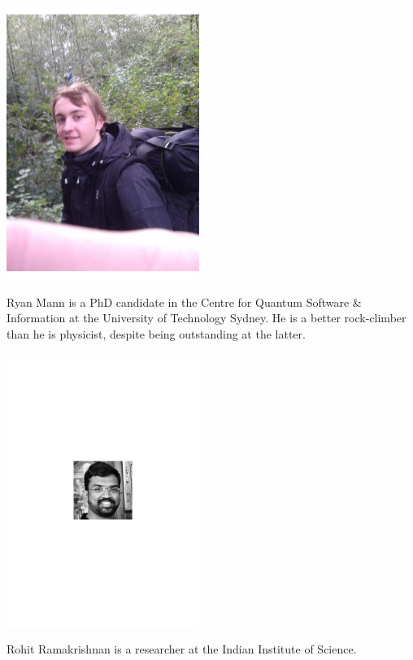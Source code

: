 
\begin{center}
\includegraphics[width=0.47\textwidth]{photo_ryan_mann}
\end{center}

Ryan Mann is a PhD candidate in the Centre for Quantum Software \& Information at the University of Technology Sydney. He is a better rock-climber than he is physicist, despite being outstanding at the latter.


\begin{center}
\includegraphics[width=0.47\textwidth]{photo_rohit_ramakrishnan}
\end{center}

Rohit Ramakrishnan is a researcher at the Indian Institute of Science.

